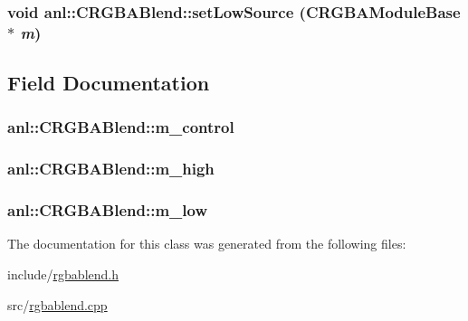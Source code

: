 \label{classanl_1_1CRGBABlend_afec2c97ec9f8b23afe1e4cacda23439d}
\hypertarget{classanl_1_1CRGBABlend_aa4f4e253ebb9839f943d90716f811eb4}{
\subsubsection[{setLowSource}]{\setlength{\rightskip}{0pt plus 5cm}void anl::CRGBABlend::setLowSource ({\bf CRGBAModuleBase} $\ast$ {\em m})}}
\label{classanl_1_1CRGBABlend_aa4f4e253ebb9839f943d90716f811eb4}


\subsection{Field Documentation}
\hypertarget{classanl_1_1CRGBABlend_a67620ea84f5da10b93016bf7260fac47}{
\subsubsection[{m\_\-control}]{ {\bf anl::CRGBABlend::m\_\-control}}}
\label{classanl_1_1CRGBABlend_a67620ea84f5da10b93016bf7260fac47}
\hypertarget{classanl_1_1CRGBABlend_a8705dc0a379c270a3449e8ca5a27de55}{
\subsubsection[{m\_\-high}]{ {\bf anl::CRGBABlend::m\_\-high}}}
\label{classanl_1_1CRGBABlend_a8705dc0a379c270a3449e8ca5a27de55}
\hypertarget{classanl_1_1CRGBABlend_a836e47fb212a578353fc9bdbf59851cf}{
\subsubsection[{m\_\-low}]{ {\bf anl::CRGBABlend::m\_\-low}}}
\label{classanl_1_1CRGBABlend_a836e47fb212a578353fc9bdbf59851cf}


The documentation for this class was generated from the following files:\begin{DoxyCompactItemize}
\item 
include/\hyperlink{rgbablend_8h}{rgbablend.h}\item 
src/\hyperlink{rgbablend_8cpp}{rgbablend.cpp}\end{DoxyCompactItemize}
